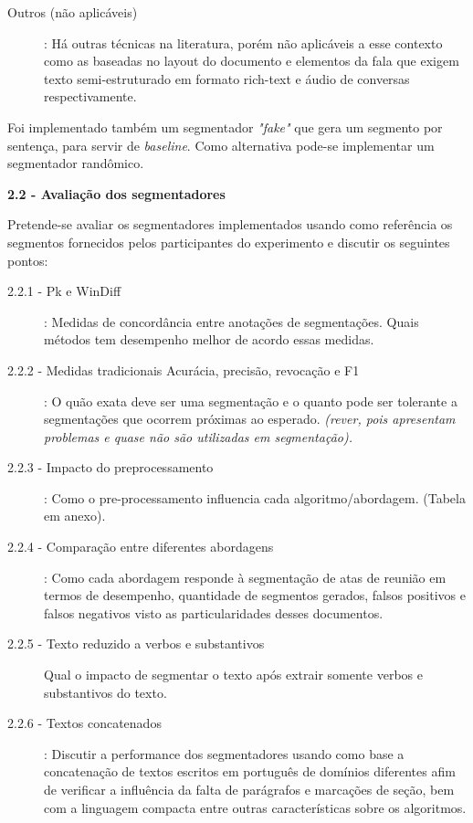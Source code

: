 \begin{enumerate}
\begin{description}
	\item [Outros (não aplicáveis)]: Há outras técnicas na literatura, porém não aplicáveis a esse contexto como as baseadas no layout do documento e elementos da fala que exigem texto semi-estruturado em formato rich-text e áudio de conversas respectivamente.

		
	\end{description}

	Foi implementado também um segmentador \textit{"fake"} que gera um segmento por sentença, para servir de \textit{baseline}. Como alternativa pode-se implementar um segmentador randômico.
	
	
		
		
	 
\textbf{2.2 - Avaliação dos segmentadores	}

Pretende-se avaliar os segmentadores implementados usando como referência os segmentos fornecidos pelos participantes do experimento e discutir os seguintes pontos:

\begin{description}

	\item[2.2.1 - Pk e WinDiff]: Medidas de concordância entre anotações de segmentações. Quais métodos tem desempenho melhor de acordo essas medidas.
	\item[2.2.2 - Medidas tradicionais Acurácia, precisão, revocação e F1]: O quão exata deve ser uma segmentação e o quanto pode ser tolerante a segmentações que ocorrem próximas ao esperado. \textit{(rever, pois apresentam problemas e quase não são utilizadas em segmentação).}
	\item[2.2.3 - Impacto do preprocessamento]: Como o pre-processamento influencia cada algoritmo/abordagem. (Tabela em anexo).
	\item [2.2.4 - Comparação entre diferentes abordagens]: Como cada abordagem responde à segmentação de atas de reunião em termos de desempenho, quantidade de segmentos gerados, falsos positivos e falsos negativos visto as particularidades desses documentos.%
	\item [2.2.5 - Texto reduzido a verbos e substantivos] Qual o impacto de segmentar o texto após extrair somente verbos e substantivos do texto.
	\item [2.2.6 - Textos concatenados]: Discutir a performance dos segmentadores usando como base a concatenação de textos escritos em português de domínios diferentes afim de verificar a influência da falta de parágrafos e marcações de seção, bem com a linguagem compacta entre outras características sobre os algoritmos.
\end{description}



\end{enumerate}
